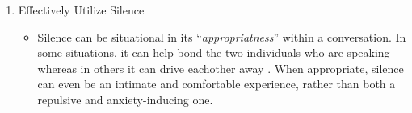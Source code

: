 \documentclass[stu,12pt]{apa7}
\begin{document}
\begin{enumerate}
        \item Effectively Utilize Silence
          \begin{itemize}
            \item Silence can be situational in its ``\textit{appropriatness}''
              within a conversation. In some situations, it can help bond the
              two individuals who are speaking whereas in others it can
              drive eachother away
              \parencite[pp. 600]{gerd_antos_handbook_2008}. When appropriate,
              silence can even be an intimate and comfortable experience, rather
              than both a repulsive and anxiety-inducing one.
          \end{itemize}
      \end{enumerate}

  
  

  \newpage
  \printbibliography[%
    title={Works Cited},%
    heading={bibintoc},%
    notcategory={consulted}%
  ]

  \newpage
  \nocite{*}
  \printbibliography[%
    title={Works Consulted},%
    heading={bibintoc},%
    category={consulted}%
  ]
\end{document}
